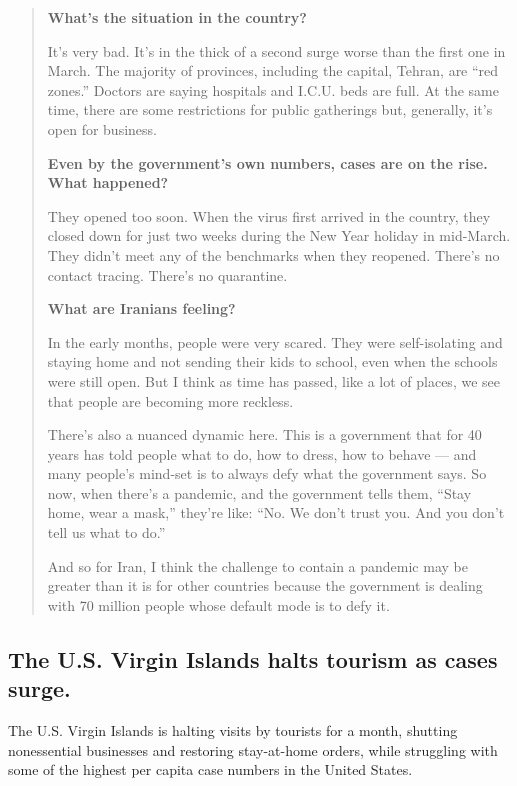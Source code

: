 \begin{quote}
\textbf{What's the situation in the country?}

It's very bad. It's in the thick of a second surge worse than the first
one in March. The majority of provinces, including the capital, Tehran,
are ``red zones.'' Doctors are saying hospitals and I.C.U. beds are
full. At the same time, there are some restrictions for public
gatherings but, generally, it's open for business.

\textbf{Even by the government's own numbers, cases are on the rise.
What happened?}

They opened too soon. When the virus first arrived in the country, they
closed down for just two weeks during the New Year holiday in mid-March.
They didn't meet any of the benchmarks when they reopened. There's no
contact tracing. There's no quarantine.

\textbf{What are Iranians feeling?}

In the early months, people were very scared. They were self-isolating
and staying home and not sending their kids to school, even when the
schools were still open. But I think as time has passed, like a lot of
places, we see that people are becoming more reckless.

There's also a nuanced dynamic here. This is a government that for 40
years has told people what to do, how to dress, how to behave --- and
many people's mind-set is to always defy what the government says. So
now, when there's a pandemic, and the government tells them, ``Stay
home, wear a mask,'' they're like: ``No. We don't trust you. And you
don't tell us what to do.''

And so for Iran, I think the challenge to contain a pandemic may be
greater than it is for other countries because the government is dealing
with 70 million people whose default mode is to defy it.
\end{quote}

\hypertarget{the-us-virgin-islands-halts-tourism-as-cases-surge}{%
\subsection{The U.S. Virgin Islands halts tourism as cases
surge.}\label{the-us-virgin-islands-halts-tourism-as-cases-surge}}

The U.S. Virgin Islands is halting visits by tourists for a month,
shutting nonessential businesses and restoring stay-at-home orders,
while struggling with some of the highest per capita case numbers in the
United States.

